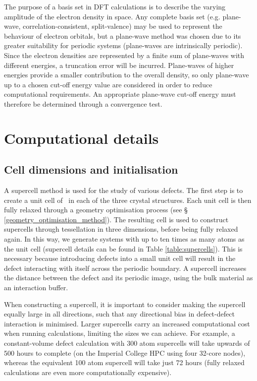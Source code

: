 The purpose of a basis set in DFT calculations is to describe the varying amplitude of the electron density in space. Any complete basis set (e.g. plane-wave, correlation-consistent, split-valence) may be used to represent the behaviour of electron orbitals, but a plane-wave method was chosen due to its greater suitability for periodic systems (plane-waves are intrinsically periodic). Since the electron densities are represented by a finite sum of plane-waves with different energies, a truncation error will be incurred. Plane-waves of higher energies provide a smaller contribution to the overall density, so only plane-wave up to a chosen cut-off energy value are considered in order to reduce computational requirements. An appropriate plane-wave cut-off energy must therefore be determined through a convergence test. 



\section{Computational details}
\subsection{Cell dimensions and initialisation}

A supercell method is used for the study of various defects. The first step is to create a unit cell of \zirconia\ in each of the three crystal structures. Each unit cell is then fully relaxed through a geometry optimisation process (see § \ref{geometry_optimisation_method}). The resulting cell is used to construct supercells through tessellation in three dimensions, before being fully relaxed again. In this way, we generate systems with up to ten times as many atoms as the unit cell (supercell details can be found in Table \ref{table:supercells}). This is necessary because introducing defects into a small unit cell will result in the defect interacting with itself across the periodic boundary. A supercell increases the distance between the defect and its periodic image, using the bulk material as an interaction buffer. 

When constructing a supercell, it is important to consider making the supercell equally large in all directions, such that any directional bias in defect-defect interaction is minimised. Larger supercells carry an increased computational cost when running calculations, limiting the sizes we can achieve. For example, a constant-volume defect calculation with 300 atom supercells will take upwards of 500 hours to complete (on the Imperial College HPC using four 32-core nodes), whereas the equivalent 100 atom supercell will take just 72 hours (fully relaxed calculations are even more computationally expensive).


